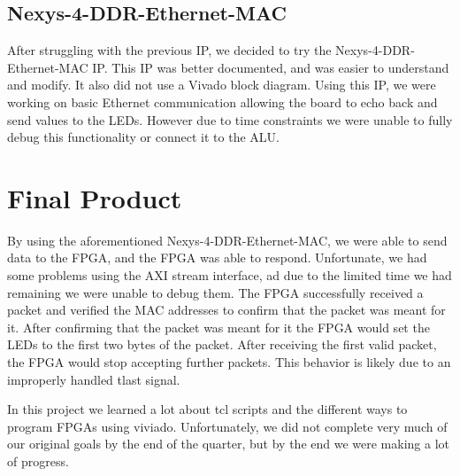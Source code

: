 \documentclass{article}
\begin{document}
\subsection*{Nexys-4-DDR-Ethernet-MAC}

After struggling with the previous IP, we decided to try the Nexys-4-DDR-Ethernet-MAC IP. This IP was better documented, and was easier to understand and modify. It also did not use a Vivado block diagram. Using this IP, we were working on basic Ethernet communication allowing the board to echo back and send values to the LEDs. However due to time constraints we were unable to fully debug this functionality or connect it to the ALU.
\section*{Final Product}

By using the aforementioned Nexys-4-DDR-Ethernet-MAC, we were able to send data to the FPGA, and the FPGA was able to respond. Unfortunate, we had some problems using the AXI stream interface, ad due to the limited time we had remaining we were unable to debug them. The FPGA successfully received a packet and verified the MAC addresses to confirm that the packet was meant for it. After confirming that the packet was meant for it the FPGA would set the LEDs to the first two bytes of the packet. After receiving the first valid packet, the FPGA would stop accepting further packets. This behavior is likely due to an improperly handled tlast signal.

In this project we learned a lot about tcl scripts and the different ways to program FPGAs using viviado. Unfortunately, we did not complete very much of our original goals by the end of the quarter, but by the end we were making a lot of progress.
\end{document}
